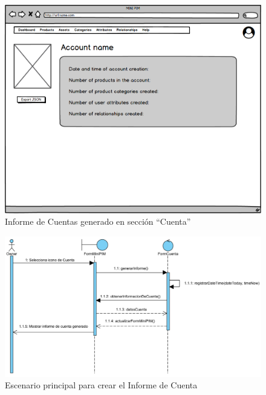 \begin{figure}[H]
    \includegraphics[width=1\linewidth]{assets/mockups/RF1.9CrearInformeCuenta.png}
    \caption{Informe de Cuentas generado en sección \enquote{Cuenta}}
   \end{figure}
\vspace{1.0cm}

\newpage %

\begin{figure}[H]
    \includegraphics[width=1\linewidth]{assets/sequence/RF1.9_CrearInformeCuenta_v4.png}
    \caption{Escenario principal para crear el Informe de Cuenta}
   \end{figure}
\vspace{1.0cm}

\newpage %